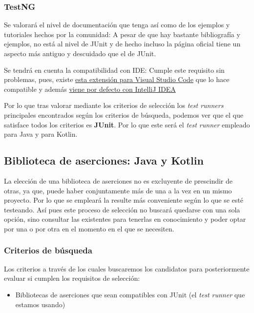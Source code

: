 \subsubsection{TestNG}

\begin{todolist}
    \item Se valorará el nivel de documentación que tenga así como de los
    ejemplos y tutoriales hechos por la comunidad: A pesar de que hay bastante
    bibliografía y ejemplos, no está al nivel de JUnit y de hecho incluso la
    página oficial tiene un aspecto más antiguo y descuidado que el de JUnit.
    \item[\xcmark] Se tendrá en cuenta la compatibilidad con IDE: Cumple este
    requisito sin problemas, pues, existe
    \href{https://code.visualstudio.com/docs/java/java-testing}{esta extensión para
    Visual Studio Code} que lo hace compatible y además
    \href{https://www.jetbrains.com/help/idea/testng.html}{viene por defecto con
    IntelliJ IDEA}
\end{todolist}


Por lo que tras valorar mediante los criterios de selección los \emph{test
runners} principales encontrados según los criterios de búsqueda, podemos ver
que el que satisface todos los criterios es \textbf{JUnit}. Por lo que este será
el \emph{test runner} empleado para Java y para Kotlin.


\subsection{Biblioteca de aserciones: Java y Kotlin}

La elección de una biblioteca de aserciones no es excluyente de prescindir de
otras, ya que, puede haber conjuntamente más de una a la vez en un mismo
proyecto. Por lo que se empleará la resulte más conveniente según lo que se esté
testeando. Así pues este proceso de selección no buscará quedarse con una sola
opción, sino consultar las existentes para tenerlas en conocimiento y poder
optar por una o por otra en el momento en el que se necesiten.

\subsubsection{Criterios de búsqueda}

Los criterios a través de los cuales buscaremos los candidatos para
posteriormente evaluar si cumplen los requisitos de selección:
\begin{itemize}
    \item Bibliotecas de aserciones que sean compatibles con JUnit (el
    \emph{test runner} que estamos usando)
\end{itemize}

